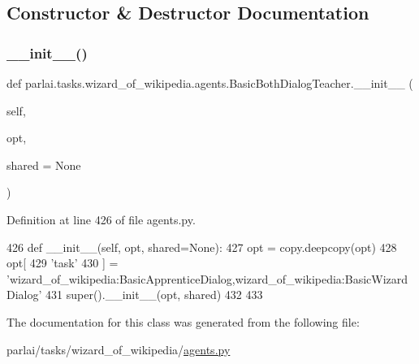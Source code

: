 \subsection{Constructor \& Destructor Documentation}
\mbox{\label{classparlai_1_1tasks_1_1wizard__of__wikipedia_1_1agents_1_1BasicBothDialogTeacher_a8542415af7170c35c6c5844b28099072}} 
\subsubsection{\texorpdfstring{\+\_\+\+\_\+init\+\_\+\+\_\+()}{\_\_init\_\_()}}
{\footnotesize\ttfamily def parlai.\+tasks.\+wizard\+\_\+of\+\_\+wikipedia.\+agents.\+Basic\+Both\+Dialog\+Teacher.\+\_\+\+\_\+init\+\_\+\+\_\+ (\begin{DoxyParamCaption}\item[{}]{self,  }\item[{}]{opt,  }\item[{}]{shared = {\ttfamily None} }\end{DoxyParamCaption})}



Definition at line 426 of file agents.\+py.


\begin{DoxyCode}
426     \textcolor{keyword}{def }\_\_init\_\_(self, opt, shared=None):
427         opt = copy.deepcopy(opt)
428         opt[
429             \textcolor{stringliteral}{'task'}
430         ] = \textcolor{stringliteral}{'wizard\_of\_wikipedia:BasicApprenticeDialog,wizard\_of\_wikipedia:BasicWizardDialog'}
431         super().\_\_init\_\_(opt, shared)
432 
433 
\end{DoxyCode}


The documentation for this class was generated from the following file\+:\begin{DoxyCompactItemize}
\item 
parlai/tasks/wizard\+\_\+of\+\_\+wikipedia/\hyperlink{parlai_2tasks_2wizard__of__wikipedia_2agents_8py}{agents.\+py}\end{DoxyCompactItemize}
